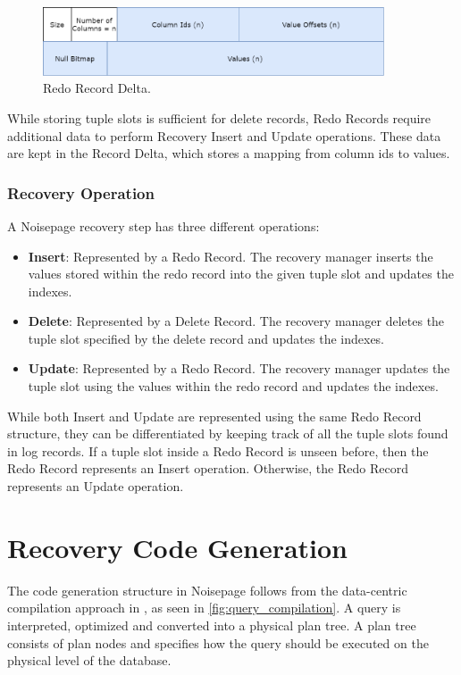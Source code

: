 \documentclass[12pt]{cmuthesis}
\begin{document}
\begin{figure}[H]
\centering
\includegraphics[width=0.9\textwidth]{images/Delta.png}
\caption{Redo Record Delta.}
\label{fig:logging}
\end{figure}

 While storing tuple slots is sufficient for delete records, Redo Records require additional data to perform Recovery Insert and Update operations. These data are kept in the Record Delta, which stores a mapping from column ids to values.

\subsubsection{Recovery Operation}
A Noisepage recovery step has three different operations:
\begin{itemize}
    \item \textbf{Insert}: Represented by a Redo Record. The recovery manager inserts the values stored within the redo record into the given tuple slot and updates the indexes.
    \item \textbf{Delete}: Represented by a Delete Record. The recovery manager deletes the tuple slot specified by the delete record and updates the indexes.
    \item \textbf{Update}: Represented by a Redo Record. The recovery manager updates the tuple slot using the values within the redo record and updates the indexes.
\end{itemize}

While both Insert and Update are represented using the same Redo Record structure, they can be differentiated by keeping track of all the tuple slots found in log records. If a tuple slot inside a Redo Record is unseen before, then the Redo Record represents an Insert operation. Otherwise, the Redo Record represents an Update operation.

\section{Recovery Code Generation}
The code generation structure in Noisepage follows from the data-centric compilation approach in \cite{neumann11}, as seen in \ref{fig:query_compilation}. A query is interpreted, optimized and converted into a physical plan tree. A plan tree consists of plan nodes and specifies how the query should be executed on the physical level of the database. 
\end{document}

